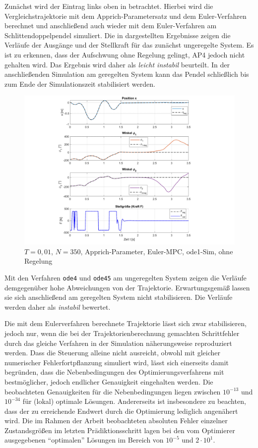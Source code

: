 Zunächst wird der Eintrag links oben in  betrachtet. Hierbei wird die Vergleichstrajektorie mit dem Apprich-Parametersatz und dem Euler-Verfahren berechnet und anschließend auch wieder mit dem Euler-Verfahren am Schlittendoppelpendel simuliert. Die in  dargestellten Ergebnisse zeigen die Verläufe der Ausgänge und der Stellkraft für das zunächst ungeregelte System. Es ist zu erkennen, dass der Aufschwung ohne Regelung gelingt, AP4 jedoch nicht gehalten wird. Das Ergebnis wird daher als \textit{leicht instabil} beurteilt. In der anschließenden Simulation am geregelten System kann das Pendel schließlich bis zum Ende der Simulationszeit stabilisiert werden.
\begin{figure}[h]
	\centering
		\includegraphics[scale=\scaleyplots]{Bilder/Trajektorien/F400T0.01_app_euler_ode1.pdf}
	\caption{$T=0,01$, $N=350$, Apprich-Parameter, Euler-MPC, ode1-Sim, ohne Regelung}
	\label{fig:F400T0.01_app_euler_ode1}
\end{figure}

Mit den Verfahren \texttt{ode4} und \texttt{ode45} am ungeregelten System zeigen die Verläufe demgegenüber hohe Abweichungen von der Trajektorie. Erwartungsgemäß lassen sie sich anschließend am geregelten System nicht stabilisieren. Die Verläufe werden daher als \textit{instabil} bewertet. 

Die mit dem Eulerverfahren berechnete Trajektorie lässt sich zwar stabilisieren, jedoch nur, wenn die bei der Trajektorienberechnung gemachten Schrittfehler durch das gleiche Verfahren in der Simulation näherungsweise reproduziert werden. Dass die Steuerung alleine nicht ausreicht, obwohl mit gleicher numerischer Fehlerfortpflanzung simuliert wird, lässt sich einerseits damit begründen, dass die Nebenbedingungen des Optimierungsverfahrens mit bestmöglicher, jedoch endlicher Genauigkeit eingehalten werden. Die beobachteten Genauigkeiten für die Nebenbedingungen liegen zwischen $10^{-13}$ und $10^{-34}$ für (lokal) optimale Lösungen. Andererseits ist insbesondere zu beachten, dass der zu erreichende Endwert durch die Optimierung lediglich angenähert wird. Die im Rahmen der Arbeit beobachteten absoluten Fehler einzelner Zustandsgrößen im letzten Prädiktionsschritt lagen bei den vom Optimierer ausgegebenen "`optimalen"' Lösungen im Bereich von $10^{-5}$ und $2 \cdot 10^{1}$.

